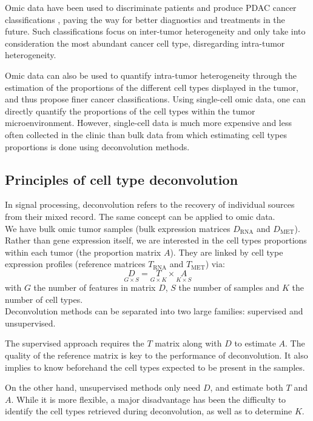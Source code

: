 \documentclass{article}
\begin{document}
Omic data have been used to discriminate patients and produce PDAC cancer classifications \cite{moffitt_2015_stratification, puleo_2018_stratification}, paving the way for better diagnostics and treatments in the future.
Such classifications focus on inter-tumor heterogeneity and only take into consideration the most abundant cancer cell type, disregarding intra-tumor heterogeneity.

Omic data can also be used to quantify intra-tumor heterogeneity through the estimation of the proportions of the different cell types displayed in the tumor, and thus propose finer cancer classifications.
Using single-cell omic data, one can directly quantify the proportions of the cell types within the tumor microenvironment.
However, single-cell data is much more expensive and less often collected in the clinic than bulk data from which estimating cell types proportions is done using deconvolution methods.

\subsection{Principles of cell type deconvolution}\label{subsec:cell-type-deconvolution}

In signal processing, deconvolution refers to the recovery of individual sources from their mixed record.
The same concept can be applied to omic data. \\

We have bulk omic tumor samples (bulk expression matrices $D_{\text{RNA}}$ and $D_{\text{MET}}$).
Rather than gene expression itself, we are interested in the cell types proportions within each tumor (the proportion matrix $A$). 
They are linked by cell type expression profiles (reference matrices $T_{\text{RNA}}$ and $T_{\text{MET}}$) via:
$$
\underset{G \times S}{D} = \underset{G \times K}{T} \times \underset{K \times S}A
$$
with $G$ the number of features in matrix $D$, $S$ the number of samples and $K$ the number of cell types. \\

Deconvolution methods can be separated into two large families: supervised and unsupervised.

The supervised approach requires the $T$ matrix along with $D$ to estimate $A$. 
The quality of the reference matrix is key to the performance of deconvolution. 
It also implies to know beforehand the cell types expected to be present in the samples.

On the other hand, unsupervised methods only need $D$, and estimate both $T$ and $A$. 
While it is more flexible, a major disadvantage has been the difficulty to identify the cell types retrieved during deconvolution, as well as to determine $K$.
\end{document}
